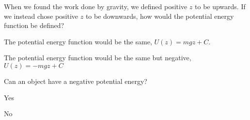 \begin{checkpoint}
\begin{MCquestion}{When we found the work done by gravity, we defined positive $z$ to be upwards. If we instead chose positive $z$ to be downwards, how would the potential energy function be defined?}
\item The potential energy function would be the same, $U(z)=mgz+C$.
\item The potential energy function would be the same but negative, $U(z)=-mgz+C$ \correct
\end{MCquestion}

\end{checkpoint}
\begin{checkpoint}
\begin{MCquestion}{Can an object have a negative potential energy?}
\item Yes \correct %
\item No
\end{MCquestion}
\end{checkpoint}
\vspace{-0.25cm}
